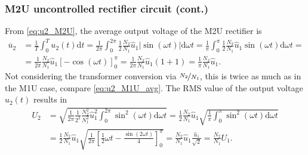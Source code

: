 \begin{frame}
    \frametitle{M2U uncontrolled rectifier circuit (cont.)}
    From \eqref{eq:u2_M2U}, the average output voltage of the M2U rectifier is
    \begin{equation}
        \begin{split}
            \overline{u}_2 &= \frac{1}{T} \int_{0}^{T} u_2(t) \mathrm{d}t = \frac{1}{2\pi} \int_{0}^{2\pi} \frac{1}{2}\frac{N_2}{N_1}\hat{u}_1 \left|\sin(\omega t)\right| \mathrm{d}\omega t =\frac{1}{\pi} \int_{0}^{\pi} \frac{1}{2}\frac{N_2}{N_1}\hat{u}_1 \sin(\omega t) \mathrm{d}\omega t =\\
            &= \frac{1}{2\pi}\frac{N_2}{N_1}\hat{u}_1 \left[ - \cos(\omega t) \right]_{0}^{\pi} = \frac{1}{2\pi}\frac{N_2}{N_1}\hat{u}_1 \left( 1+1 \right) = \frac{1}{\pi}\frac{N_2}{N_1}\hat{u}_1.
        \end{split}
        \label{eq:u2_M2U_avg}
    \end{equation}
    Not considering the transformer conversion via $\nicefrac{N_2}{N_1}$, this is twice as much as in the M1U case, compare \eqref{eq:u2_M1U_avg}. The RMS value of the output voltage $u_2(t)$ results in
    \begin{equation}
        \begin{split}
        U_2 &= \sqrt{\frac{1}{2\pi} \frac{1}{2^2}\frac{N_2^2}{N_1^2} \hat{u}_1^2 \int_{0}^{2 \pi}  \sin^2(\omega t) \mathrm{d}\omega t} = \frac{1}{2}\frac{N_2}{N_1} \hat{u}_1 \sqrt{\frac{1}{\pi}  \int_{0}^{\pi}  \sin^2(\omega t) \mathrm{d}\omega t} \\&= \frac{1}{2}\frac{N_2}{N_1} \hat{u}_1 \sqrt{\frac{1}{2\pi}\left[\frac{1}{2}\omega t - \frac{\sin(2 \omega t)}{4}\right]_0^\pi}= \frac{N_2}{N_1} \hat{u}_1\frac{\hat{u}_1}{\sqrt{2}} = \frac{N_2}{N_1} U_1.
        \end{split}
        \label{eq:u2_M2U_rms}
    \end{equation}
\end{frame}

